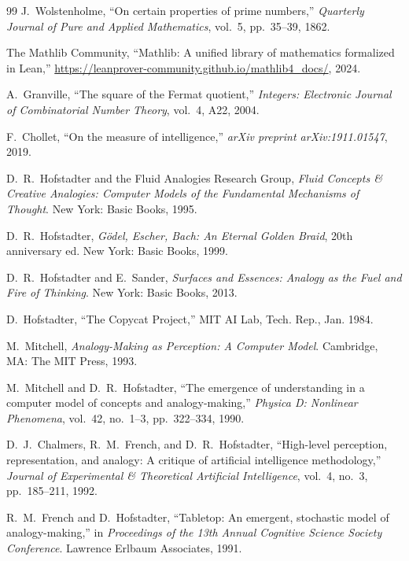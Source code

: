 \documentclass[11pt]{article}
\theoremstyle{definition}
\theoremstyle{remark}
\begin{document}
\begin{thebibliography}{99}
J.~Wolstenholme, ``On certain properties of prime numbers,'' \emph{Quarterly Journal of Pure and Applied Mathematics}, vol.~5, pp.~35--39, 1862.

The Mathlib Community, ``Mathlib: A unified library of mathematics formalized in Lean,'' \url{https://leanprover-community.github.io/mathlib4_docs/}, 2024.

A.~Granville, ``The square of the Fermat quotient,'' \emph{Integers: Electronic Journal of Combinatorial Number Theory}, vol.~4, A22, 2004.

F.~Chollet, ``On the measure of intelligence,'' \emph{arXiv preprint arXiv:1911.01547}, 2019.

D.~R.~Hofstadter and the Fluid Analogies Research Group, \emph{Fluid Concepts \& Creative Analogies: Computer Models of the Fundamental Mechanisms of Thought}. New York: Basic Books, 1995.

D.~R.~Hofstadter, \emph{G\"odel, Escher, Bach: An Eternal Golden Braid}, 20th anniversary ed. New York: Basic Books, 1999.

D.~R.~Hofstadter and E.~Sander, \emph{Surfaces and Essences: Analogy as the Fuel and Fire of Thinking}. New York: Basic Books, 2013.

D.~Hofstadter, ``The Copycat Project,'' MIT AI Lab, Tech. Rep., Jan. 1984.

M.~Mitchell, \emph{Analogy-Making as Perception: A Computer Model}. Cambridge, MA: The MIT Press, 1993.

M.~Mitchell and D.~R.~Hofstadter, ``The emergence of understanding in a computer model of concepts and analogy-making,'' \emph{Physica D: Nonlinear Phenomena}, vol.~42, no.~1--3, pp.~322--334, 1990.

D.~J.~Chalmers, R.~M.~French, and D.~R.~Hofstadter, ``High-level perception, representation, and analogy: A critique of artificial intelligence methodology,'' \emph{Journal of Experimental \& Theoretical Artificial Intelligence}, vol.~4, no.~3, pp.~185--211, 1992.

R.~M.~French and D.~Hofstadter, ``Tabletop: An emergent, stochastic model of analogy-making,'' in \emph{Proceedings of the 13th Annual Cognitive Science Society Conference}. Lawrence Erlbaum Associates, 1991.


\end{thebibliography}
\end{document}
